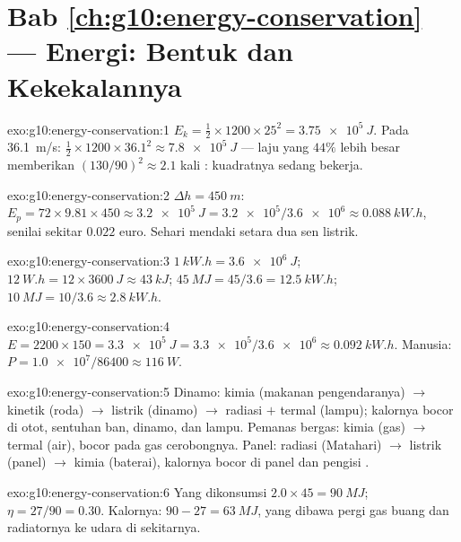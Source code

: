 \section*{Bab \ref{ch:g10:energy-conservation} --- Energi: Bentuk dan Kekekalannya}

\begin{solution}{exo:g10:energy-conservation:1}
$E_k = \tfrac12 \times 1200 \times 25^2 = \qty{3.75e5}{J}$. Pada
\qty{36.1}{m/s}: $\tfrac12 \times 1200 \times 36.1^2 \approx
\qty{7.8e5}{J}$ --- laju yang $44\%$ lebih besar memberikan
$(130/90)^2 \approx 2.1$ kali : kuadratnya sedang
bekerja.
\end{solution}

\begin{solution}{exo:g10:energy-conservation:2}
$\Delta h = \qty{450}{m}$:
$E_p = 72 \times 9.81 \times 450 \approx \qty{3.2e5}{J}
= \num{3.2e5}/\num{3.6e6} \approx \qty{0.088}{kW.h}$, senilai sekitar
$0.022$ euro. Sehari mendaki setara dua sen listrik.
\end{solution}

\begin{solution}{exo:g10:energy-conservation:3}
$\qty{1}{kW.h} = \qty{3.6e6}{J}$;
$\qty{12}{W.h} = 12 \times \qty{3600}{J} \approx \qty{43}{kJ}$;
$\qty{45}{MJ} = 45/3.6 = \qty{12.5}{kW.h}$;
$\qty{10}{MJ} = 10/3.6 \approx \qty{2.8}{kW.h}$.
\end{solution}

\begin{solution}{exo:g10:energy-conservation:4}
$E = 2200 \times 150 = \qty{3.3e5}{J}
= \num{3.3e5}/\num{3.6e6} \approx \qty{0.092}{kW.h}$. Manusia:
$P = \num{1.0e7}/\num{86400} \approx \qty{116}{W}$.
\end{solution}

\begin{solution}{exo:g10:energy-conservation:5}
Dinamo: kimia (makanan pengendaranya) $\to$ kinetik (roda) $\to$
listrik (dinamo) $\to$ radiasi $+$ termal (lampu); kalornya bocor di
otot, sentuhan ban, dinamo, dan lampu. Pemanas bergas: kimia (gas)
$\to$ termal (air), bocor pada gas cerobongnya. Panel: radiasi
(Matahari) $\to$ listrik (panel) $\to$ kimia (baterai), kalornya bocor
di panel dan pengisi .
\end{solution}

\begin{solution}{exo:g10:energy-conservation:6}
Yang dikonsumsi $2.0 \times 45 = \qty{90}{MJ}$; $\eta = 27/90 = 0.30$.
Kalornya: $90 - 27 = \qty{63}{MJ}$, yang dibawa pergi gas buang dan
radiatornya ke udara di sekitarnya.
\end{solution}

